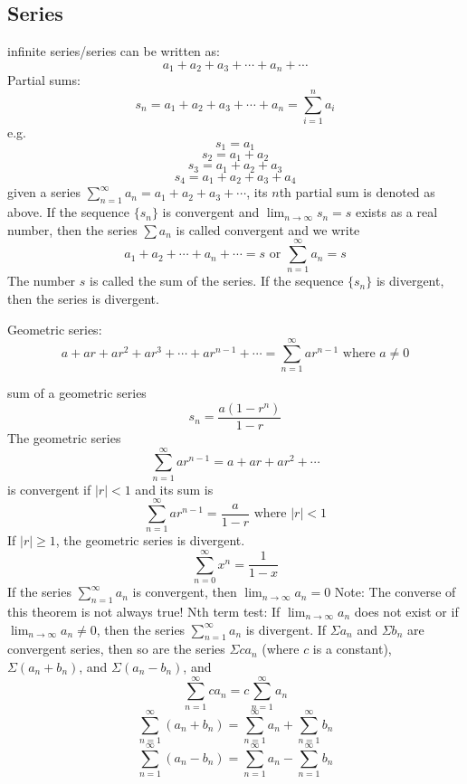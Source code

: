\documentclass{article}
\begin{document}
    \subsection{Series}
    \begin{outline}
        \1 infinite series/series can be written as: \[a_1+a_2+a_3+\cdots+a_n+\cdots\]
        \1 Partial sums: \[s_n=a_1+a_2+a_3+\cdots+a_n=\sum^n_{i=1}a_i\] e.g. \[s_1=a_1\]\[s_2=a_1+a_2\]\[s_3=a_1+a_2+a_3\]\[s_4=a_1+a_2+a_3+a_4\]
        \1 given a series \(\sum^\infty_{n=1}a_n=a_1+a_2+a_3+\cdots\), its $n$th partial sum is denoted as above.
            \2 If the sequence \(\{s_n\}\) is convergent and \(\lim_{n\to\infty}s_n=s\) exists as a real number, then the series \(\sum a_n\) is called convergent and we write \[a_1+a_2+\cdots+a_n+\cdots=s\mbox{ or }\sum^\infty_{n=1}a_n=s\]
            \2 The number $s$ is called the sum of the series. If the sequence \(\{s_n\}\) is divergent, then the series is divergent. 
        \end{outline}
        \begin{outline}
            \1 Geometric series: \[a+ar+ar^2+ar^3+\cdots+ar^{n-1}+\cdots=\sum^\infty_{n=1}ar^{n-1}\mbox{ where }a\neq0\]
        \end{outline}
            \begin{outline}
        \1 sum of a geometric series \[s_n=\dfrac{a\left(1-r^n\right)}{1-r}\]
        \1 The geometric series \[\sum^\infty_{n=1}ar^{n-1}=a+ar+ar^2+\cdots\] is convergent if \(|r|<1\) and its sum is \[\sum^\infty_{n=1}ar^{n-1}=\dfrac{a}{1-r}\mbox{ where }|r|<1\] If \(|r|\geq1\), the geometric series is divergent. 
        \1 \[\sum^\infty_{n=0}x^n=\dfrac{1}{1-x}\]
        \1 If the series \(\sum^\infty_{n=1}a_n\) is convergent, then \(\lim_{n\to\infty}a_n=0\)
            \2 Note: The converse of this theorem is not always true!
        \1 Nth term test: If \(\lim_{n\to\infty}a_n\) does not exist or if \(\lim_{n\to\infty}a_n\neq0\), then the series \(\sum_{n=1}^\infty a_n\) is divergent. 
        \1 If \(\Sigma a_n\) and \(\Sigma b_n\) are convergent series, then so are the series \(\Sigma ca_n\) (where $c$ is a constant), \(\Sigma\left(a_n+b_n\right)\), and \(\Sigma\left(a_n-b_n\right)\), and \[\sum^\infty_{n=1}ca_n=c\sum^\infty_{n=1}a_n\]\[\sum^\infty_{n=1}\left(a_n+b_n\right)=\sum^\infty_{n=1}a_n+\sum^\infty_{n=1}b_n\]\[\sum^\infty_{n=1}\left(a_n-b_n\right)=\sum^\infty_{n=1}a_n-\sum^\infty_{n=1}b_n\]

    \end{outline}
\end{document}
